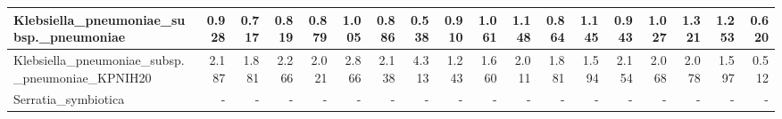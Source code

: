 \documentclass[12pt,a4paper]{article}
\begin{document}
\begin{table}[ht]
\begin{center}
\begin{tabular}{|l*{17}{|r}|}
Klebsiella\_pneumoniae\_subsp.\_pneumoniae & 0.928 & 0.717 & 0.819 & 0.879 & 1.005 & 0.886 & 0.538 & 0.910 & 1.061 & 1.148 & 0.864 & 1.145 & 0.943 & 1.027 & 1.321 & 1.253 & 0.620 \\ \hline
Klebsiella\_pneumoniae\_subsp.\_pneumoniae\_KPNIH20 & 2.187 & 1.881 & 2.266 & 2.021 & 2.866 & 2.138 & 4.313 & 1.243 & 1.660 & 2.011 & 1.881 & 1.594 & 2.154 & 2.068 & 2.078 & 1.597 & 0.512 \\ \hline
Serratia\_symbiotica & - & - & - & - & - & - & - & - & - & - & - & - & - & - & - & - & - \\ \hline
\end{tabular}
\end{center}
\end{table}
\end{document}
